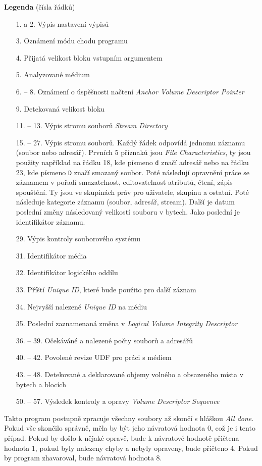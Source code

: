 \textbf{Legenda} (čísla řádků)
\begin{enumerate}
    \item[1. a 2.] Výpis nastavení výpisů
    \item[3.] Oznámení módu chodu programu
    \item[4.] Přijatá velikost bloku vstupním argumentem
    \item[5.] Analyzované médium
    \item[6. -- 8.] Oznámení o úspěšnosti načtení \textit{Anchor Volume Descriptor Pointer}
    \item[9.] Detekovaná velikost bloku
    \item[11. -- 13.] Výpis stromu souborů \textit{Stream Directory}
    \item[15. -- 27.] Výpis stromu souborů. Každý řádek odpovídá jednomu záznamu (soubor nebo adresář). Prvních 5 příznaků jsou \textit{File Characteristics}, ty jsou použity například na řádku 18, kde písmeno \texttt{d} značí adresář nebo na řádku 23, kde písmeno \texttt{D} značí smazaný soubor. Poté následují opravnění práce se záznamem v pořadí smazatelnost, editovatelnost atributů, čtení, zápis spouštění. Ty jsou ve skupinách práv pro uživatele, skupinu a ostatní. Poté následuje kategorie záznamu (soubor, adresář, stream). Další je datum poslední změny následovaný velikostí souboru v bytech. Jako poslední je identifikátor záznamu.
    \item[29.] Výpis kontroly souborového systému
    \item[31.] Identifikátor média
    \item[32.] Identifikátor logického oddílu
    \item[33.] Příští \textit{Unique ID}, které bude použito pro další záznam
    \item[34.] Nejvyšší nalezené \textit{Unique ID} na médiu
    \item[35.] Poslední zaznamenaná změna v \textit{Logical Volume Integrity Descriptor}
    \item[36. -- 39.] Očekáváné a nalezené počty souborů a adresářů
    \item[40. -- 42.] Povolené revize UDF pro práci s médiem
    \item[43. -- 48.] Detekované a deklarované objemy volného a obsazeného místa v bytech a blocích
    \item[50. -- 57.] Výsledek kontroly a opravy \textit{Volume Descriptor Sequence}
\end{enumerate}
Takto program postupně zpracuje všechny soubory až skončí s hláškou \textit{All done}. Pokud vše skončilo správně, měla by být jeho návratová hodnota 0, což je i tento případ. Pokud by došlo k nějaké opravě, bude k návratové hodnotě přičtena hodnota 1, pokud byly nalezeny chyby a nebyly opraveny, bude přičteno 4. Pokud by program zhavaroval, bude návratová hodnota 8.

